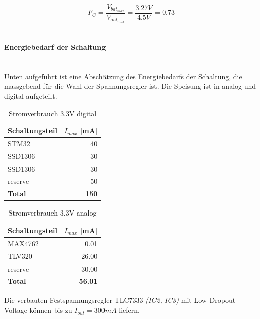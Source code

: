 \begin{equation}
F_C=\frac{V_{bat_{max}}}{V_{out_{max}}}=\frac{3.27\si{V}}{4.5\si{V}}=\underline{0.7\bar{3}}
\end{equation}
\\
\paragraph{Energiebedarf der Schaltung}\vspace{-0.3cm}\\
Unten aufgeführt ist eine Abschätzung des Energiebedarfs der Schaltung, die massgebend für die Wahl der Spannungsregler ist. Die Speisung ist in analog und digital aufgeteilt.

\begin{table}[H]
\centering
\begin{tabular}{|l|r|}
\hline
\textbf{Schaltungsteil} & \textbf{$I_{max}$ {[}\si{mA}{]}} \\ \hline
STM32                   & 40                     \\ \hline
SSD1306                 & 30                     \\ \hline
SSD1306                 & 30                     \\ \hline
reserve                 & 50                     \\ \hline
\textbf{Total}          & \textbf{150}          \\ \hline
\end{tabular}
\caption{Stromverbrauch 3.3V digital}
\end{table}

\begin{table}[H]
\centering
\begin{tabular}{|l|r|}
\hline
\textbf{Schaltungsteil} & \textbf{$I_{max}$ {[}\si{mA}{]}} \\ \hline
MAX4762                 & 0.01                   \\ \hline
TLV320                  & 26.00                  \\ \hline
reserve                 & 30.00                  \\ \hline
\textbf{Total}          & \textbf{56.01}        \\ \hline
\end{tabular}
\caption{Stromverbrauch 3.3V analog}
\end{table}

Die verbauten Festspannungsregler TLC7333 \textit{(IC2, IC3)} mit Low Dropout Voltage können bis zu ${I_{out}=300\si{mA}}$ liefern.\\

